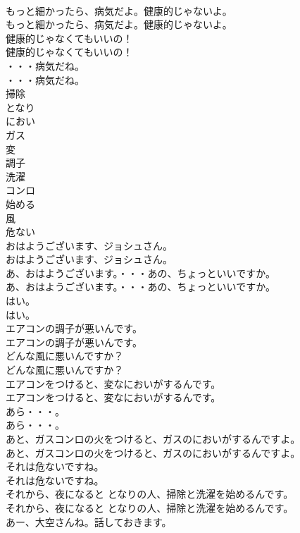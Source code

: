 \documentclass[8pt]{extreport}
\begin{document}
\begin{CJK}{UTF8}{min}
\\	もっと細かったら、病気だよ。健康的じゃないよ。	
\\	もっと細かったら、病気だよ。健康的じゃないよ。 
\\	健康的じゃなくてもいいの！	
\\	健康的じゃなくてもいいの！ 
\\	・・・病気だね。	
\\	・・・病気だね。 
\\	掃除
\\	となり
\\	におい
\\	ガス
\\	変
\\	調子
\\	洗濯
\\	コンロ
\\	始める
\\	風
\\	危ない
\\	おはようございます、ジョシュさん。	
\\	おはようございます、ジョシュさん。 
\\	あ、おはようございます。・・・あの、ちょっといいですか。	
\\	あ、おはようございます。・・・あの、ちょっといいですか。 
\\	はい。	
\\	はい。 
\\	エアコンの調子が悪いんです。	
\\	エアコンの調子が悪いんです。 
\\	どんな風に悪いんですか？	
\\	どんな風に悪いんですか？ 
\\	エアコンをつけると、変なにおいがするんです。	
\\	エアコンをつけると、変なにおいがするんです。 
\\	あら・・・。	
\\	あら・・・。 
\\	あと、ガスコンロの火をつけると、ガスのにおいがするんですよ。	
\\	あと、ガスコンロの火をつけると、ガスのにおいがするんですよ。 
\\	それは危ないですね。	
\\	それは危ないですね。 
\\	それから、夜になると となりの人、掃除と洗濯を始めるんです。	
\\	それから、夜になると となりの人、掃除と洗濯を始めるんです。 
\\	あー、大空さんね。話しておきます。	

\end{CJK}
\end{document}
